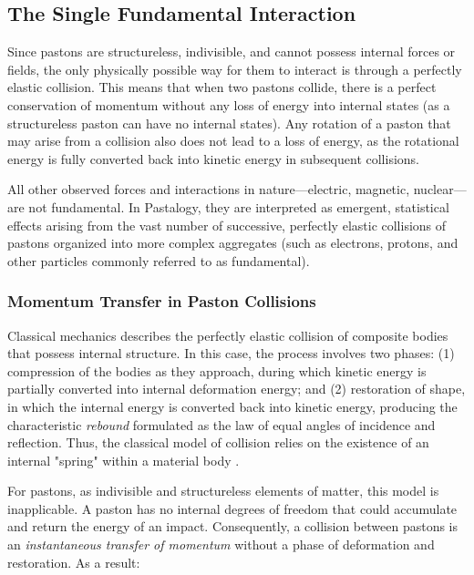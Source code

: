 \documentclass[pdflatex,sn-mathphys-num]{sn-jnl}
\begin{document}
\subsection{The Single Fundamental Interaction}\label{subsec:interaction}

Since pastons are structureless, indivisible, and cannot possess internal forces or fields, the only physically possible way for them to interact is through a perfectly elastic collision. This means that when two pastons collide, there is a perfect conservation of momentum without any loss of energy into internal states (as a structureless paston can have no internal states). Any rotation of a paston that may arise from a collision also does not lead to a loss of energy, as the rotational energy is fully converted back into kinetic energy in subsequent collisions.

All other observed forces and interactions in nature---electric, magnetic, nuclear---are not fundamental. In Pastalogy, they are interpreted as emergent, statistical effects arising from the vast number of successive, perfectly elastic collisions of pastons organized into more complex aggregates (such as electrons, protons, and other particles commonly referred to as fundamental).

\subsubsection{Momentum Transfer in Paston Collisions}\label{subsubsec:impulse-transfer}

Classical mechanics describes the perfectly elastic collision of composite bodies that possess internal structure. In this case, the process involves two phases: (1) compression of the bodies as they approach, during which kinetic energy is partially converted into internal deformation energy; and (2) restoration of shape, in which the internal energy is converted back into kinetic energy, producing the characteristic \emph{rebound} formulated as the law of equal angles of incidence and reflection. Thus, the classical model of collision relies on the existence of an internal "spring" within a material body \cite{feynman-lectures-v1}.

For pastons, as indivisible and structureless elements of matter, this model is inapplicable. A paston has no internal degrees of freedom that could accumulate and return the energy of an impact. Consequently, a collision between pastons is an \emph{instantaneous transfer of momentum} without a phase of deformation and restoration. As a result:
\end{document}
